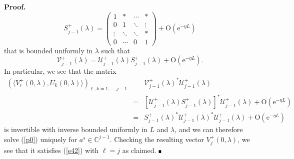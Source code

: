 \documentclass[10pt]{article}
\newenvironment{Proof}[1][.]%
 {\begin{trivlist}\item[]\textbf{Proof#1 }}%
 {\hspace*{\fill}$\rule{0.3\baselineskip}{0.35\baselineskip}$\end{trivlist}}
\numberwithin{equation}{section}
\newcommand{\C}{\mathbb{C}}
\newcommand{\rme}{\mathrm{e}}
\newcommand{\rmO}{\mathrm{O}}
\begin{document}
\begin{Proof}
\begin{equation}\label{e83}
S^+_{j-1}(\lambda) = \begin{pmatrix} 1 & * & \cdots & * \\ 0 & 1 & \ddots & \vdots \\
\vdots & \ddots & \ddots & * \\ 0 & \cdots & 0 & 1\end{pmatrix} + \rmO(\rme^{-\eta L})
\end{equation}
that is bounded uniformly in $\lambda$ such that
\[
\mathcal{V}^+_{j-1}(\lambda) = \mathcal{U}^+_{j-1}(\lambda) S^+_{j-1}(\lambda) + \rmO(\rme^{-\eta L}).
\]
In particular, we see that the matrix
\begin{eqnarray*}
(\langle V^+_\ell(0,\lambda),U_k(0,\lambda) \rangle)_{\ell,k=1,\dots,j-1} & = &
\mathcal{V}^+_{j-1}(\lambda)^* \mathcal{U}^+_{j-1}(\lambda) \\ & = &
\left[\mathcal{U}^+_{j-1}(\lambda) S^+_{j-1}(\lambda)\right]^* \mathcal{U}^+_{j-1}(\lambda)
+ \rmO(\rme^{-\eta L}) \\ & = &
S^+_{j-1}(\lambda)^* \mathcal{U}^+_{j-1}(\lambda)^* \mathcal{U}^+_{j-1}(\lambda) + \rmO(\rme^{-\eta L})
\end{eqnarray*}
is invertible with inverse bounded uniformly in $L$ and $\lambda$, and we can therefore solve (\ref{p0}) uniquely for $a^s\in\C^{j-1}$. Checking the resulting vector $V^+_j(0,\lambda)$, we see that it satisfies (\ref{e42}) with $\ell=j$ as claimed.
\end{Proof}
\end{document}
